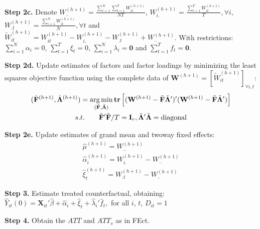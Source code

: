 \documentclass[12pt]{article}
\let\oldcenter\center
\let\oldendcenter\endcenter
\renewenvironment{center}{\setlength\topsep{0pt}\oldcenter}{\oldendcenter}
\begin{document}
\begin{adjustwidth}{20pt}{20pt}
\noindent\textbf{Step 2c.} Denote 
$ W_{..}^{(h+1)} = \frac{\sum\limits_{i=1}^{N}\sum\limits_{t=1}^{T}W_{it}^{(h+1)}}
{NT} $, 
$ W_{i.}^{(h+1)} = \frac{\sum\limits_{t=1}^{T}W_{it}^{(h+1)}}{T}, \forall i $, 
$ W_{.t}^{(h+1)} = \frac{\sum\limits_{i=1}^{N}W_{it}^{(h+1)}}{N}, \forall t $ and 
$ \tilde{W}_{it}^{(h+1)} = W_{it}^{(h+1)} - W_{i.}^{(h+1)} - W_{.t}^{(h+1)} 
+ W_{..}^{(h+1)} $.  With restrictions: 
$ \sum_{i=1}^{N} \alpha_i = 0 $, $ \sum_{t=1}^{T} \xi_t = 0 $, 
$ \sum_{i=1}^{N} \lambda_i = \mathbf{0} $ and 
$ \sum_{t=1}^{T} f_t = \mathbf{0} $. 


\noindent\textbf{Step 2d.} Update estimates of factors and factor loadings by minimizing the least squares objective function using the complete data of $\mathbf{W}^{(h+1)} = [\tilde{W}_{it}^{(h+1)}]_{\forall i,t}$:
\begin{gather}
  (\hat{\mathbf{F}}^{(h+1)},\hat{\mathbf{\Lambda}}^{(h+1)}) = 
  \mathop{\arg\min}_{(\tilde{\mathbf{F}},\tilde{\mathbf{\Lambda}})}\text{\textbf{tr}}
  \left[
    (\mathbf{W}^{(h+1)}-\tilde{\mathbf{F}}\tilde{\mathbf{\Lambda}}^{\prime})^{\prime}
    (\mathbf{W}^{(h+1)}-\tilde{\mathbf{F}}\tilde{\mathbf{\Lambda}}^{\prime})
  \right] \nonumber  \\
  s.t.
    \qquad \tilde{\mathbf{F}}^{\prime}\tilde{\mathbf{F}}/T = \mathbf{I}_{r} ,
    \tilde{\mathbf{\Lambda}}^{\prime}\tilde{\mathbf{\Lambda}} = \text{diagonal} \nonumber
\end{gather}

\noindent\textbf{Step 2e.} Update estimates of grand mean and twoway fixed effects:
\begin{gather}
\hat{\mu}^{(h+1)} = W_{..}^{(h+1)} \nonumber \\
\hat{\alpha}_i^{(h+1)} = W_{i.}^{(h+1)} - W_{..}^{(h+1)} \nonumber \\
\hat{\xi}_t^{(h+1)} = W_{.t}^{(h+1)} - W_{..}^{(h+1)} \nonumber
\end{gather}

\noindent\textbf{Step 3.} Estimate treated counterfactual, obtaining:
\begin{center}
  $\hat{Y}_{it}(0) = \mathbf{X}_{it}'\hat\beta + \hat\alpha_{i} + \hat\xi_{t} + \hat{\lambda}_{i}'\hat{f}_{t},$ for all $i$, $t$, $D_{it}=1$
\end{center}

\noindent\textbf{Step 4.} Obtain the $ATT$ and $ATT_{s}$ as in FEct.

\end{adjustwidth}

\bigskip
\end{document}
